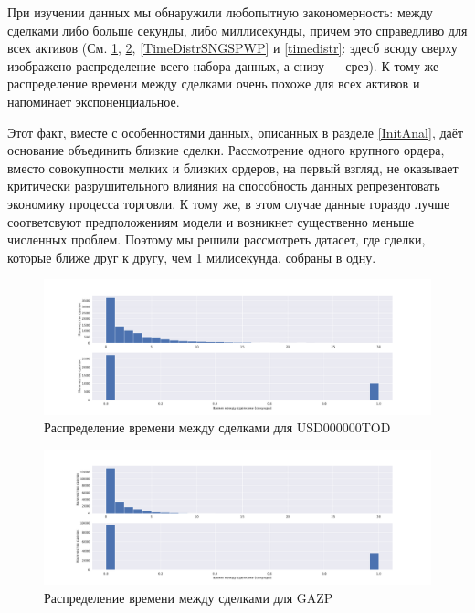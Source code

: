 При изучении данных мы обнаружили любопытную закономерность: между сделками либо 
больше секунды, либо миллисекунды, причем это справедливо для всех активов
(См. \ref{TimeDistrUSD000000TOD}, \ref{TimeDistrGAZPWP}, \ref{TimeDistrSNGSPWP} и \ref{timedistr}: 
здесб всюду сверху изображено распределение всего набора данных, а снизу --- срез).
К тому же распределение времени между сделками очень похоже для всех активов и напоминает экспоненциальное.
\par 
Этот факт, вместе с особенностями данных, описанных в разделе \ref{InitAnal}, даёт основание 
объединить близкие сделки. Рассмотрение одного крупного ордера, вместо совокупности мелких и близких ордеров,
на первый взгляд, не оказывает критически разрушительного влияния на способность данных репрезентовать экономику процесса торговли. 
К тому же, в этом случае данные гораздо лучше соответсвуют предположениям модели и возникнет существенно меньше численных проблем. 
Поэтому мы решили рассмотреть датасет, где сделки, которые ближе друг к другу, чем 1 милисекунда, собраны в одну.

\begin{figure}
    \includegraphics[scale=0.35]{fig/timedistr/CU/USD000000TOD.pdf}
    \caption{Распределение времени между сделками для USD000000TOD}
    \label{TimeDistrUSD000000TOD}
\end{figure}

\begin{figure}
    \includegraphics[scale=0.35]{fig/timedistr/SE/GAZP.pdf}
    \caption{Распределение времени между сделками для GAZP}
    \label{TimeDistrGAZPWP}
\end{figure}

